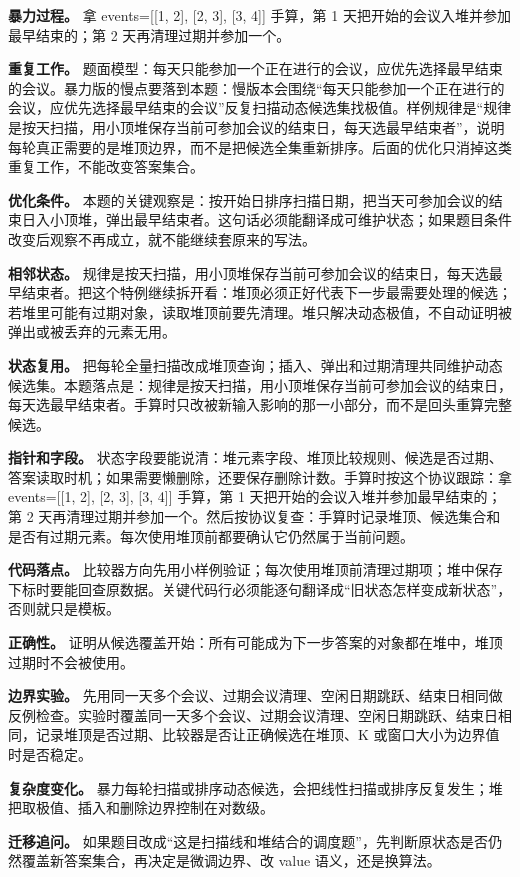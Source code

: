 \textbf{暴力过程。} 拿 events=[[1, 2], [2, 3], [3, 4]] 手算，第 1 天把开始的会议入堆并参加最早结束的；第 2 天再清理过期并参加一个。

\textbf{重复工作。} 题面模型：每天只能参加一个正在进行的会议，应优先选择最早结束的会议。暴力版的慢点要落到本题：慢版本会围绕“每天只能参加一个正在进行的会议，应优先选择最早结束的会议”反复扫描动态候选集找极值。样例规律是“规律是按天扫描，用小顶堆保存当前可参加会议的结束日，每天选最早结束者”，说明每轮真正需要的是堆顶边界，而不是把候选全集重新排序。后面的优化只消掉这类重复工作，不能改变答案集合。

\textbf{优化条件。} 本题的关键观察是：按开始日排序扫描日期，把当天可参加会议的结束日入小顶堆，弹出最早结束者。这句话必须能翻译成可维护状态；如果题目条件改变后观察不再成立，就不能继续套原来的写法。

\textbf{相邻状态。} 规律是按天扫描，用小顶堆保存当前可参加会议的结束日，每天选最早结束者。把这个特例继续拆开看：堆顶必须正好代表下一步最需要处理的候选；若堆里可能有过期对象，读取堆顶前要先清理。堆只解决动态极值，不自动证明被弹出或被丢弃的元素无用。

\textbf{状态复用。} 把每轮全量扫描改成堆顶查询；插入、弹出和过期清理共同维护动态候选集。本题落点是：规律是按天扫描，用小顶堆保存当前可参加会议的结束日，每天选最早结束者。手算时只改被新输入影响的那一小部分，而不是回头重算完整候选。

\textbf{指针和字段。} 状态字段要能说清：堆元素字段、堆顶比较规则、候选是否过期、答案读取时机；如果需要懒删除，还要保存删除计数。手算时按这个协议跟踪：拿 events=[[1, 2], [2, 3], [3, 4]] 手算，第 1 天把开始的会议入堆并参加最早结束的；第 2 天再清理过期并参加一个。然后按协议复查：手算时记录堆顶、候选集合和是否有过期元素。每次使用堆顶前都要确认它仍然属于当前问题。

\textbf{代码落点。} 比较器方向先用小样例验证；每次使用堆顶前清理过期项；堆中保存下标时要能回查原数据。关键代码行必须能逐句翻译成“旧状态怎样变成新状态”，否则就只是模板。

\textbf{正确性。} 证明从候选覆盖开始：所有可能成为下一步答案的对象都在堆中，堆顶过期时不会被使用。

\textbf{边界实验。} 先用同一天多个会议、过期会议清理、空闲日期跳跃、结束日相同做反例检查。实验时覆盖同一天多个会议、过期会议清理、空闲日期跳跃、结束日相同，记录堆顶是否过期、比较器是否让正确候选在堆顶、K 或窗口大小为边界值时是否稳定。

\textbf{复杂度变化。} 暴力每轮扫描或排序动态候选，会把线性扫描或排序反复发生；堆把取极值、插入和删除边界控制在对数级。

\textbf{迁移追问。} 如果题目改成“这是扫描线和堆结合的调度题”，先判断原状态是否仍然覆盖新答案集合，再决定是微调边界、改 value 语义，还是换算法。


